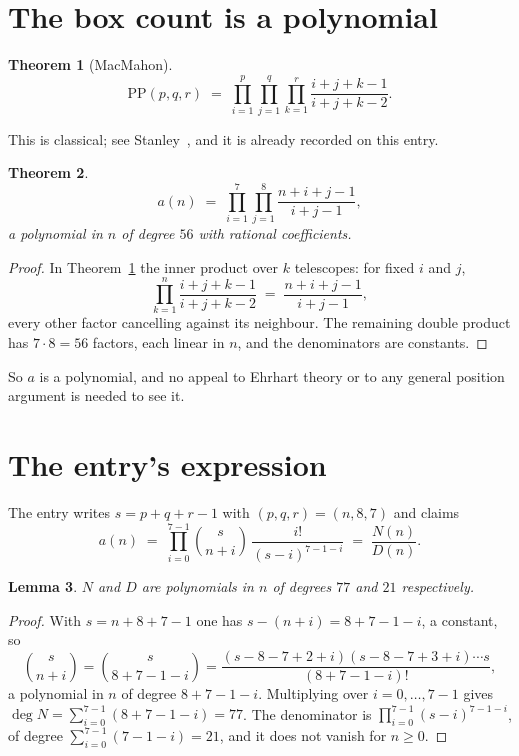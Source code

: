 \documentclass[11pt,a4paper]{article}
\theoremstyle{plain}
\newtheorem{theorem}{Theorem}
\newtheorem{lemma}[theorem]{Lemma}
\theoremstyle{definition}
\begin{document}
\section{The box count is a polynomial}

\begin{theorem}[MacMahon]\label{thm:mm}
\[
\mathrm{PP}(p,q,r)\;=\;\prod_{i=1}^{p}\prod_{j=1}^{q}\prod_{k=1}^{r}
\frac{i+j+k-1}{i+j+k-2} .
\]
\end{theorem}

This is classical; see Stanley~\cite{stanley}, and it is already recorded on this entry.

\begin{theorem}\label{thm:poly}
\[
a(n)\;=\;\prod_{i=1}^{7}\prod_{j=1}^{8}\frac{n+i+j-1}{i+j-1},
\]
a polynomial in $n$ of degree $56$ with rational coefficients.
\end{theorem}

\begin{proof}
In Theorem~\ref{thm:mm} the inner product over $k$ telescopes: for fixed $i$ and $j$,
\[
\prod_{k=1}^{n}\frac{i+j+k-1}{i+j+k-2}\;=\;\frac{n+i+j-1}{i+j-1} ,
\]
every other factor cancelling against its neighbour. The remaining double product has
$7\cdot8=56$ factors, each linear in $n$, and the denominators are constants.
\end{proof}

So $a$ is a polynomial, and no appeal to Ehrhart theory or to any general position argument is
needed to see it.

\section{The entry's expression}

The entry writes $s=p+q+r-1$ with $(p,q,r)=(n,8,7)$ and claims
\[
a(n)\;=\;\prod_{i=0}^{7-1}\binom{s}{n+i}\,\frac{i!}{(s-i)^{7-1-i}}\;=\;
\frac{N(n)}{D(n)} .
\]

\begin{lemma}\label{lem:deg}
$N$ and $D$ are polynomials in $n$ of degrees $77$ and $21$ respectively.
\end{lemma}

\begin{proof}
With $s=n+8+7-1$ one has $s-(n+i)=8+7-1-i$, a constant, so
\[
\binom{s}{n+i}=\binom{s}{8+7-1-i}
=\frac{(s-8-7+2+i)(s-8-7+3+i)\cdots s}{(8+7-1-i)!},
\]
a polynomial in $n$ of degree $8+7-1-i$. Multiplying over $i=0,\dots,7-1$ gives
$\deg N=\sum_{i=0}^{7-1}(8+7-1-i)=77$. The denominator is
$\prod_{i=0}^{7-1}(s-i)^{7-1-i}$, of degree
$\sum_{i=0}^{7-1}(7-1-i)=21$, and it does not vanish for $n\ge0$.
\end{proof}
\end{document}
